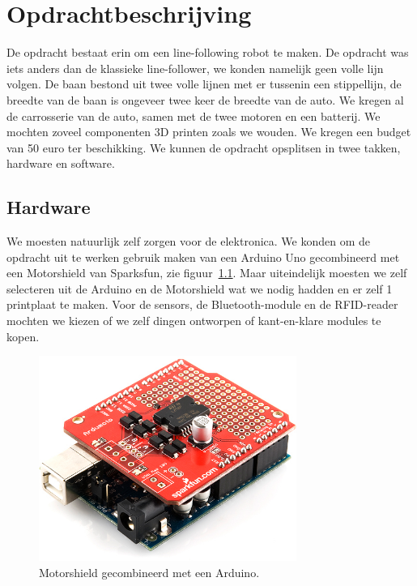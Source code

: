 \chapter{Opdrachtbeschrijving}
\label{chap:Opdrachtbeschrijving}
De opdracht bestaat erin om een line-following robot te maken. De opdracht was iets anders dan de klassieke line-follower, we konden namelijk geen volle lijn volgen. De baan bestond uit twee volle lijnen met er tussenin een stippellijn, de breedte van de baan is ongeveer twee keer de breedte van de auto. We kregen al de carrosserie van de auto, samen met de twee motoren en een batterij. We mochten zoveel componenten 3D printen zoals we wouden. We kregen een budget van 50 euro ter beschikking. We kunnen de opdracht opsplitsen in twee takken, hardware en software.
\section{Hardware}
We moesten natuurlijk zelf zorgen voor de elektronica. We konden om de opdracht uit te werken gebruik maken van een Arduino Uno gecombineerd met een Motorshield van Sparksfun, zie figuur~\ref{fig:ArduMoto}. Maar uiteindelijk moesten we zelf selecteren uit de Arduino en de Motorshield wat we nodig hadden en er zelf 1 printplaat te maken. Voor de sensors, de Bluetooth-module en de RFID-reader mochten we kiezen of we zelf dingen ontworpen of kant-en-klare modules te kopen.
\begin{figure}[h]
\centering
\includegraphics[width=0.75\textwidth]{ArduMoto.png}
\caption{Motorshield gecombineerd met een Arduino. \label{fig:ArduMoto}}
\end{figure}
